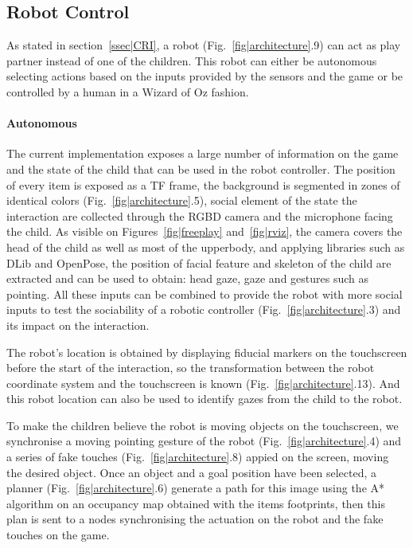 \documentclass[sigconf]{acmart}
\begin{document}

\subsection{Robot Control} As stated in section~\ref{ssec|CRI}, a robot
(Fig.~\ref{fig|architecture}.9) can act as play partner instead of one of the
children. This robot can either be autonomous selecting actions based on the
inputs provided by the sensors and the game or be controlled by a human in a
Wizard of Oz fashion.

\paragraph{Autonomous} The current implementation exposes a large number of
information on the game and the state of the child that can be used in the robot
controller. The position of every item is exposed as a TF frame, the background
is segmented in zones of identical colors (Fig.~\ref{fig|architecture}.5),
social element of the state the interaction are collected through the RGBD
camera and the microphone facing the child. As visible on
Figures~\ref{fig|freeplay} and~\ref{fig|rviz}, the camera covers the head of the
child as well as most of the upperbody, and applying libraries such as DLib and
OpenPose, the position of facial feature and skeleton of the child are extracted
and can be used to obtain: head gaze, gaze and gestures such as pointing. All
these inputs can be combined to provide the robot with more social inputs to
test the sociability of a robotic controller (Fig.~\ref{fig|architecture}.3) and
its impact on the interaction.

The robot's location is obtained by displaying fiducial markers on the
touchscreen before the start of the interaction, so the transformation between
the robot coordinate system and the touchscreen is known
(Fig.~\ref{fig|architecture}.13). And this robot location can also be used to
identify gazes from the child to the robot. 

To make the children believe the robot is moving objects on the touchscreen, we
synchronise a moving pointing gesture of the robot
(Fig.~\ref{fig|architecture}.4) and a series of fake touches
(Fig.~\ref{fig|architecture}.8) appied on the screen, moving the desired object.
Once an object and a goal position have been selected, a planner
(Fig.~\ref{fig|architecture}.6) generate a path for this image using the
A\mbox{*} algorithm on an occupancy map obtained with the items footprints, then
this plan is sent to a nodes synchronising the actuation on the robot and the
fake touches on the game.
\end{document}
